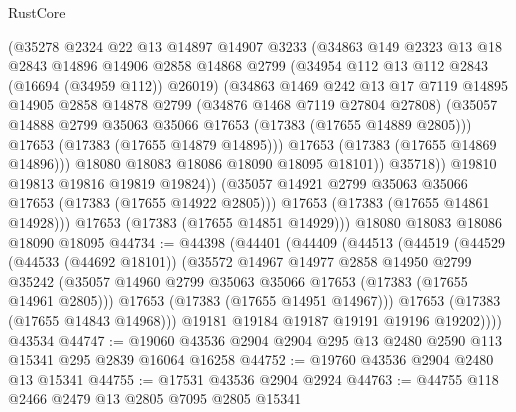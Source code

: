 \begin{lexlean}{RustCore}
\begin{coremodule}
                  (@35278
                    @2324
                    @22
                    @13
                    @14897
                    @14907
                    @3233
                    (@34863
                      @149
                      @2323
                      @13
                      @18
                      @2843
                      @14896
                      @14906
                      @2858
                      @14868
                      @2799
                      (@34954 @112 @13 @112 @2843 (@16694 (@34959 @112)) @26019)
                      (@34863
                        @1469
                        @242
                        @13
                        @17
                        @7119
                        @14895
                        @14905
                        @2858
                        @14878
                        @2799
                        (@34876 @1468 @7119 @27804 @27808)
                        (@35057 @14888 @2799 @35063 @35066 @17653 (@17383 (@17655 @14889 @2805)))
                        @17653
                        (@17383 (@17655 @14879 @14895)))
                      @17653
                      (@17383 (@17655 @14869 @14896)))
                    @18080
                    @18083
                    @18086
                    @18090
                    @18095
                    @18101))
                @35718))
            @19810
            @19813
            @19816
            @19819
            @19824))
        (@35057 @14921 @2799 @35063 @35066 @17653 (@17383 (@17655 @14922 @2805)))
        @17653
        (@17383 (@17655 @14861 @14928)))
      @17653
      (@17383 (@17655 @14851 @14929)))
    @18080
    @18083
    @18086
    @18090
    @18095
@44734 := @44398
    (@44401
      (@44409
        (@44513
          (@44519
            (@44529
              (@44533 (@44692 @18101))
              (@35572
                @14967
                @14977
                @2858
                @14950
                @2799
                @35242
                (@35057 @14960 @2799 @35063 @35066 @17653 (@17383 (@17655 @14961 @2805)))
                @17653
                (@17383 (@17655 @14951 @14967)))
              @17653
              (@17383 (@17655 @14843 @14968)))
            @19181
            @19184
            @19187
            @19191
            @19196
            @19202))))
    @43534
@44747 := @19060 @43536 @2904 @2904 @295 @13 @2480 @2590 @113 @15341 @295 @2839 @16064 @16258
@44752 := @19760 @43536 @2904 @2480 @13 @15341
@44755 := @17531 @43536 @2904 @2924
@44763 := @44755 @118 @2466 @2479 @13 @2805 @7095 @2805 @15341

\end{coremodule}
\end{lexlean}
